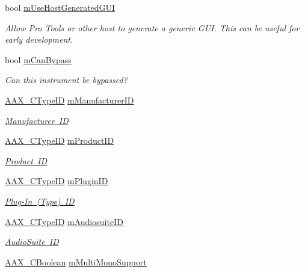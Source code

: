 \begin{DoxyCompactItemize}
bool \mbox{\hyperlink{a01957_a38bf1193daf9ebd4b0643dec21507caa}{m\+Use\+Host\+Generated\+G\+UI}}
\begin{DoxyCompactList}\small\item\em Allow Pro Tools or other host to generate a generic G\+UI. This can be useful for early development. \end{DoxyCompactList}\item 
bool \mbox{\hyperlink{a01957_a849b67e9badf7ca38a506f8010d4fff1}{m\+Can\+Bypass}}
\begin{DoxyCompactList}\small\item\em Can this instrument be bypassed? \end{DoxyCompactList}\item 
\mbox{\hyperlink{a00392_ac678f9c1fbcc26315d209f71a147a175}{A\+A\+X\+\_\+\+C\+Type\+ID}} \mbox{\hyperlink{a01957_ab28a76c6e5d7860d20b699869c108c84}{m\+Manufacturer\+ID}}
\begin{DoxyCompactList}\small\item\em \mbox{\hyperlink{a00662_a13e384f22825afd3db6d68395b79ce0da996465cca29a2a15291d1c788ac5728c}{Manufacturer ID}} \end{DoxyCompactList}\item 
\mbox{\hyperlink{a00392_ac678f9c1fbcc26315d209f71a147a175}{A\+A\+X\+\_\+\+C\+Type\+ID}} \mbox{\hyperlink{a01957_a139f8dc96e73b88a1e9f6abdfe7112c3}{m\+Product\+ID}}
\begin{DoxyCompactList}\small\item\em \mbox{\hyperlink{a00662_a13e384f22825afd3db6d68395b79ce0da3a41fcdff5af1a4fd19dcbca7b1ba6f3}{Product ID}} \end{DoxyCompactList}\item 
\mbox{\hyperlink{a00392_ac678f9c1fbcc26315d209f71a147a175}{A\+A\+X\+\_\+\+C\+Type\+ID}} \mbox{\hyperlink{a01957_a80d2c48d5a97190ed2ebec043d073142}{m\+Plugin\+ID}}
\begin{DoxyCompactList}\small\item\em \mbox{\hyperlink{a00662_a13e384f22825afd3db6d68395b79ce0da89ca3dd6e96895cda14976c1b1ceb826}{Plug-\/\+In (Type) ID}} \end{DoxyCompactList}\item 
\mbox{\hyperlink{a00392_ac678f9c1fbcc26315d209f71a147a175}{A\+A\+X\+\_\+\+C\+Type\+ID}} \mbox{\hyperlink{a01957_a9feeadf3348cf1b4ce13008d3a02aaef}{m\+Audiosuite\+ID}}
\begin{DoxyCompactList}\small\item\em \mbox{\hyperlink{a00662_a13e384f22825afd3db6d68395b79ce0dad3344696b8298a8b254add3d039ea927}{Audio\+Suite ID}} \end{DoxyCompactList}\item 
\mbox{\hyperlink{a00392_aa216506530f1d19a2965931ced2b274b}{A\+A\+X\+\_\+\+C\+Boolean}} \mbox{\hyperlink{a01957_a0803c641f72241bea5d7cf984c6263ca}{m\+Multi\+Mono\+Support}}
\end{DoxyCompactItemize}


